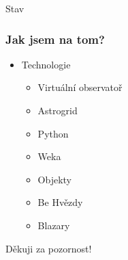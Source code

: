 \documentclass[fleqn]{beamer}
\begin{document}
\begin{section}{Stav}
\begin{frame}\frametitle{Jak jsem na tom?}
  
  \begin{itemize}
  \item Technologie

    \begin{itemize}
    \item  Virtuální observatoř
    \item  Astrogrid
    \item  Python
    \item  Weka
    \item Objekty
    \end{itemize}

  \begin{itemize}
  \item  Be Hvězdy
  \item  Blazary
  \end{itemize}


  
  \end{itemize}

\end{frame}

\begin{frame}
  \begin{center}
 \huge Děkuji za pozornost!    

  \end{center}

\end{frame}

\end{section}
\end{document}
